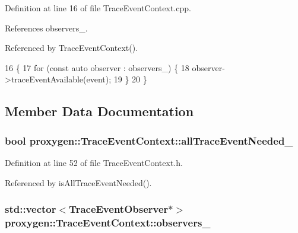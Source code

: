 Definition at line 16 of file Trace\+Event\+Context.\+cpp.



References observers\+\_\+.



Referenced by Trace\+Event\+Context().


\begin{DoxyCode}
16                                                             \{
17   \textcolor{keywordflow}{for} (\textcolor{keyword}{const} \textcolor{keyword}{auto} observer : observers_) \{
18     observer->traceEventAvailable(event);
19   \}
20 \}
\end{DoxyCode}


\subsection{Member Data Documentation}
\subsubsection[{all\+Trace\+Event\+Needed\+\_\+}]{\setlength{\rightskip}{0pt plus 5cm}bool proxygen\+::\+Trace\+Event\+Context\+::all\+Trace\+Event\+Needed\+\_\+\hspace{0.3cm}{\ttfamily [private]}}\label{classproxygen_1_1TraceEventContext_ada0ab67b1a2076379783c5edc83f2159}


Definition at line 52 of file Trace\+Event\+Context.\+h.



Referenced by is\+All\+Trace\+Event\+Needed().

\subsubsection[{observers\+\_\+}]{\setlength{\rightskip}{0pt plus 5cm}std\+::vector$<${\bf Trace\+Event\+Observer}$\ast$$>$ proxygen\+::\+Trace\+Event\+Context\+::observers\+\_\+\hspace{0.3cm}{\ttfamily [private]}}\label{classproxygen_1_1TraceEventContext_ac95d21212aab8f06b2d1b0467b93dbfa}


